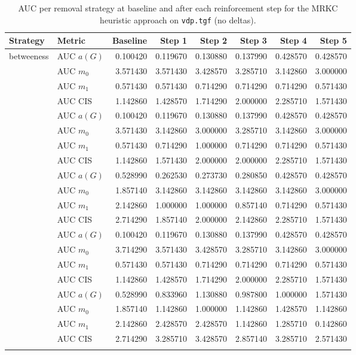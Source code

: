 \begin{table}[htbp]
  \centering
  \caption{AUC per removal strategy at baseline and after each reinforcement step for the MRKC heuristic approach on \texttt{vdp.tgf} (no deltas).}
  \label{tab:vdp-mrkc_heuristic-auc}
  \begin{tabular}{llrrrrrr}
    \toprule
    \textbf{Strategy} & \textbf{Metric} & \textbf{Baseline} & \textbf{Step 1} & \textbf{Step 2} & \textbf{Step 3} & \textbf{Step 4} & \textbf{Step 5} \\
    \midrule
    \multirow{4}{*}{betweeness} & AUC $a(G)$ & 0.100420 & 0.119670 & 0.130880 & 0.137990 & 0.428570 & 0.428570 \\
    & AUC $m_0$ & 3.571430 & 3.571430 & 3.428570 & 3.285710 & 3.142860 & 3.000000 \\
    & AUC $m_1$ & 0.571430 & 0.571430 & 0.714290 & 0.714290 & 0.714290 & 0.571430 \\
    & AUC CIS & 1.142860 & 1.428570 & 1.714290 & 2.000000 & 2.285710 & 1.571430 \\
    \addlinespace
    \multirow{4}{*}{closeness} & AUC $a(G)$ & 0.100420 & 0.119670 & 0.130880 & 0.137990 & 0.428570 & 0.428570 \\
    & AUC $m_0$ & 3.571430 & 3.142860 & 3.000000 & 3.285710 & 3.142860 & 3.000000 \\
    & AUC $m_1$ & 0.571430 & 0.714290 & 1.000000 & 0.714290 & 0.714290 & 0.571430 \\
    & AUC CIS & 1.142860 & 1.571430 & 2.000000 & 2.000000 & 2.285710 & 1.571430 \\
    \addlinespace
    \multirow{4}{*}{core influence} & AUC $a(G)$ & 0.528990 & 0.262530 & 0.273730 & 0.280850 & 0.428570 & 0.428570 \\
    & AUC $m_0$ & 1.857140 & 3.142860 & 3.142860 & 3.142860 & 3.142860 & 3.000000 \\
    & AUC $m_1$ & 2.142860 & 1.000000 & 1.000000 & 0.857140 & 0.714290 & 0.571430 \\
    & AUC CIS & 2.714290 & 1.857140 & 2.000000 & 2.142860 & 2.285710 & 1.571430 \\
    \addlinespace
    \multirow{4}{*}{degree} & AUC $a(G)$ & 0.100420 & 0.119670 & 0.130880 & 0.137990 & 0.428570 & 0.428570 \\
    & AUC $m_0$ & 3.714290 & 3.571430 & 3.428570 & 3.285710 & 3.142860 & 3.000000 \\
    & AUC $m_1$ & 0.571430 & 0.571430 & 0.714290 & 0.714290 & 0.714290 & 0.571430 \\
    & AUC CIS & 1.142860 & 1.428570 & 1.714290 & 2.000000 & 2.285710 & 1.571430 \\
    \addlinespace
    \multirow{4}{*}{random} & AUC $a(G)$ & 0.528990 & 0.833960 & 1.130880 & 0.987800 & 1.000000 & 1.571430 \\
    & AUC $m_0$ & 1.857140 & 1.142860 & 1.000000 & 1.142860 & 1.428570 & 1.142860 \\
    & AUC $m_1$ & 2.142860 & 2.428570 & 2.428570 & 1.142860 & 1.285710 & 0.142860 \\
    & AUC CIS & 2.714290 & 3.285710 & 3.428570 & 2.857140 & 3.285710 & 2.571430 \\
    \addlinespace
    \bottomrule
  \end{tabular}
\end{table}
